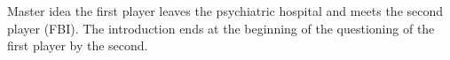 Master idea
the first player leaves the psychiatric hospital and meets the second player (FBI). The introduction ends at the beginning of the questioning of the first player by the second.